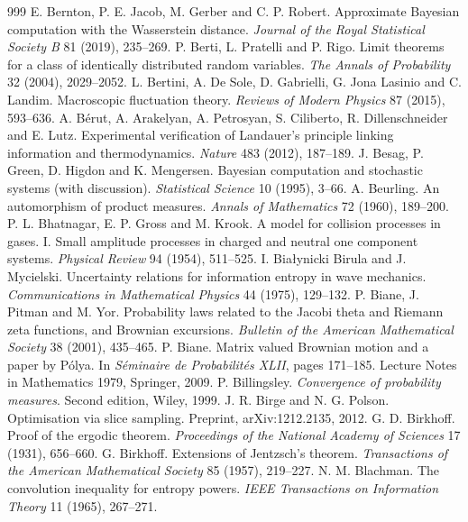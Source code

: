 \begin{thebibliography}{999}
 E. Bernton, P. E. Jacob, M. Gerber and C. P. Robert. Approximate Bayesian computation with the Wasserstein distance. \emph{Journal of the Royal Statistical Society B} 81 (2019), 235--269.
 P. Berti, L. Pratelli and P. Rigo. Limit theorems for a class of identically distributed random variables. \emph{The Annals of Probability} 32 (2004), 2029--2052.
 L. Bertini, A. De Sole, D. Gabrielli, G. Jona Lasinio and C. Landim. Macroscopic fluctuation theory. \emph{Reviews of Modern Physics} 87 (2015), 593--636.
 A. B\'erut, A. Arakelyan, A. Petrosyan, S. Ciliberto, R. Dillenschneider and E. Lutz. Experimental verification of Landauer's principle linking information and thermodynamics. \emph{Nature} 483 (2012), 187--189.
 J. Besag, P. Green, D. Higdon and K. Mengersen. Bayesian computation and stochastic systems (with discussion). \emph{Statistical Science} 10 (1995), 3--66.
 A. Beurling. An automorphism of product measures. \emph{Annals of Mathematics} 72 (1960), 189--200.
 P. L. Bhatnagar, E. P. Gross and M. Krook. A model for collision processes in gases. I. Small amplitude processes in charged and neutral one component systems. \emph{Physical Review} 94 (1954), 511--525.
 I. Bia\l{}ynicki Birula and J. Mycielski. Uncertainty relations for information entropy in wave mechanics. \emph{Communications in Mathematical Physics} 44 (1975), 129--132.
 P. Biane, J. Pitman and M. Yor. Probability laws related to the Jacobi theta and Riemann zeta functions, and Brownian excursions. \emph{Bulletin of the American Mathematical Society} 38 (2001), 435--465.
 P. Biane. Matrix valued Brownian motion and a paper by P\'olya. In \emph{S\'eminaire de Probabilit\'es XLII}, pages 171--185. Lecture Notes in Mathematics 1979, Springer, 2009.
 P. Billingsley. \emph{Convergence of probability measures}. Second edition, Wiley, 1999.
 J. R. Birge and N. G. Polson. Optimisation via slice sampling. Preprint, arXiv:1212.2135, 2012.
 G. D. Birkhoff. Proof of the ergodic theorem. \emph{Proceedings of the National Academy of Sciences} 17 (1931), 656--660.
 G. Birkhoff. Extensions of Jentzsch's theorem. \emph{Transactions of the American Mathematical Society} 85 (1957), 219--227.
 N. M. Blachman. The convolution inequality for entropy powers. \emph{IEEE Transactions on Information Theory} 11 (1965), 267--271.

\end{thebibliography}
